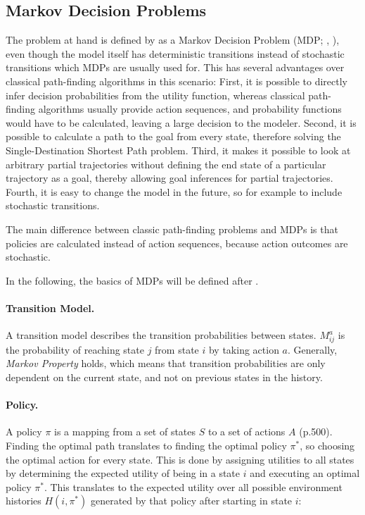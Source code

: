 \subsection{Markov Decision Problems}

The problem at hand is defined by  as a Markov Decision Problem (MDP; , ), even though the model itself has deterministic transitions instead of stochastic transitions which MDPs are usually used for. This has several advantages over classical path-finding algorithms in this scenario: First, it is possible to directly infer decision probabilities from the utility function, whereas classical path-finding algorithms usually provide action sequences, and probability functions would have to be calculated, leaving a large decision to the modeler. Second, it is possible to calculate a path to the goal from every state, therefore solving the Single-Destination Shortest Path problem. Third, it makes it possible to look at arbitrary partial trajectories without defining the end state of a particular trajectory as a goal, thereby allowing goal inferences for partial trajectories. Fourth, it is easy to change the model in the future, so for example to include stochastic transitions.

The main difference between classic path-finding problems and MDPs is that policies are calculated instead of action sequences, because action outcomes are stochastic.

In the following, the basics of MDPs will be defined after . 

\paragraph{Transition Model.}

A transition model describes the transition probabilities between states. $M^a_{ij}$ is the probability of reaching state $j$ from state $i$ by taking action $a$. Generally, \textit{Markov Property} holds, which means that transition probabilities are only dependent on the current state, and not on previous states in the history.

\paragraph{Policy.}
A policy $\pi$ is a mapping from a set of states $S$ to a set of actions $A$ \cite{russell1995} (p.500). Finding the optimal path translates to finding the optimal policy $\pi^*$, so choosing the optimal action for every state. This is done by assigning utilities to all states by determining the expected utility of being in a state $i$ and executing an optimal policy $\pi^*$.
This translates to the expected utility over all possible environment histories $H(i, \pi^*)$ generated by that policy after starting in state $i$:

